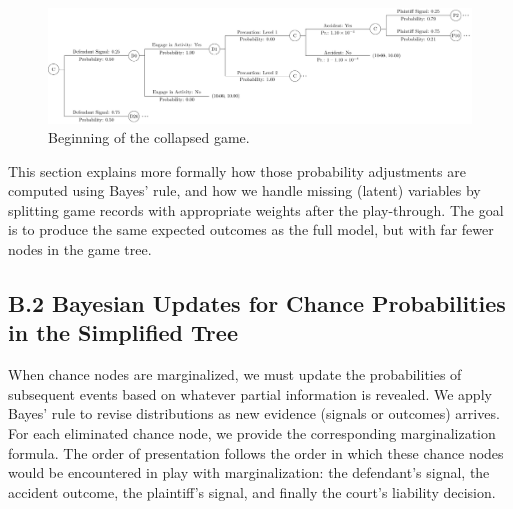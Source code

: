 \documentclass{article}
\begin{document}
  \begin{figure}[t]
    \centering
    \includegraphics[width=\textwidth]{../Figures/smalltree_collapsed_beginning.pdf}
    \caption{Beginning of the collapsed game.}
    \label{fig:smalltree_collapsed_beginning.pdf}
  \end{figure}

This section explains more formally how those probability adjustments are computed using Bayes’ rule, and how we handle missing (latent) variables by splitting game records with appropriate weights after the play-through. The goal is to produce the same expected outcomes as the full model, but with far fewer nodes in the game tree.

\subsection*{B.2 Bayesian Updates for Chance Probabilities in the Simplified Tree}

When chance nodes are marginalized, we must update the probabilities of subsequent events based on whatever partial information is revealed. We apply Bayes’ rule to revise distributions as new evidence (signals or outcomes) arrives. For each eliminated chance node, we provide the corresponding marginalization formula. The order of presentation follows the order in which these chance nodes would be encountered in play with marginalization: the defendant’s signal, the accident outcome, the plaintiff’s signal, and finally the court’s liability decision.
\end{document}
